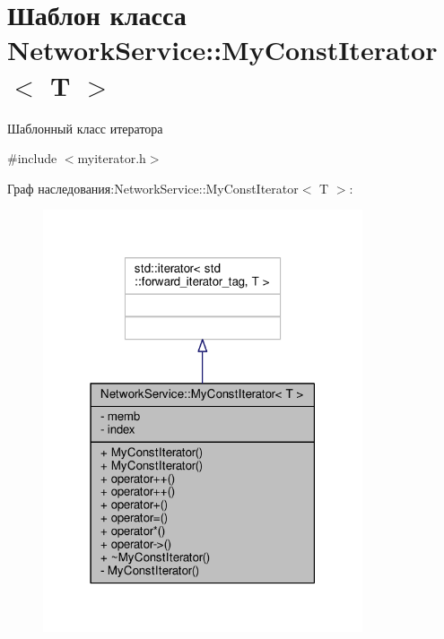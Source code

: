 \hypertarget{class_network_service_1_1_my_const_iterator}{}\section{Шаблон класса Network\+Service\+:\+:My\+Const\+Iterator$<$ T $>$}
\label{class_network_service_1_1_my_const_iterator}


Шаблонный класс итератора  




{\ttfamily \#include $<$myiterator.\+h$>$}



Граф наследования\+:Network\+Service\+:\+:My\+Const\+Iterator$<$ T $>$\+:\nopagebreak
\begin{figure}[H]
\begin{center}
\leavevmode
\includegraphics[width=267pt]{class_network_service_1_1_my_const_iterator__inherit__graph}
\end{center}
\end{figure}



